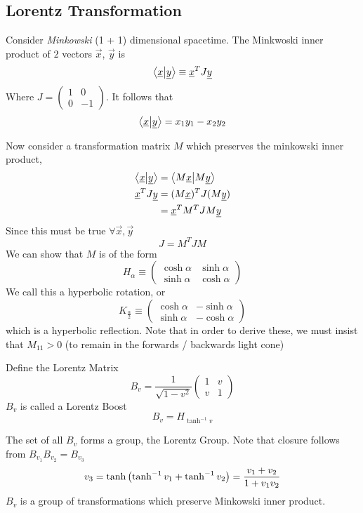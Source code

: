 \documentclass{article}
\numberwithin{equation}{section}
\begin{document}
\subsection{Lorentz Transformation}
Consider \emph{Minkowski} (1 + 1) dimensional spacetime. 
The Minkwoski inner product of $2$ vectors $\vec x$, $\vec y$ is 
\begin{equation}\label{eq:7-1}
    \left\langle \underline{x}\middle\vert \underline{y} \right\rangle \equiv \underline{x}^T J \underline{y}
\end{equation}
Where $J = \begin{pmatrix}
    1 & 0 \\
    0 & -1
\end{pmatrix}$. It follows that
\begin{equation}\label{eq:7-2}
    \left\langle \underline{x}\middle\vert \underline{y} \right\rangle = x_1y_1 - x_2y_2
\end{equation}

Now consider a transformation matrix $M$ which preserves the minkowski inner product,
\begin{align*}
    \left\langle \underline{x}\middle\vert \underline{y} \right\rangle &= \left\langle M\underline{x}\middle\vert M\underline{y} \right\rangle \\
    \underline{x}^T J \underline{y} &= (M\underline{x})^T J (M\underline{y}) \\
    &= \underline{x}^T M^T J M \underline{y}
\end{align*}
Since this must be true $\forall \vec x, \vec y$
\begin{equation}\label{eq:7-3}
    J = M^T J M
\end{equation}
We can show that $M$ is of the form
\[
    H_\alpha \equiv \begin{pmatrix}
        \cosh \alpha & \sinh \alpha \\
        \sinh \alpha & \cosh \alpha
    \end{pmatrix}
\]
We call this a hyperbolic rotation, or 
\[
    K_\frac{\alpha}{2} \equiv \begin{pmatrix}
        \cosh \alpha & - \sinh \alpha \\
        \sinh \alpha & - \cosh \alpha
    \end{pmatrix}
\]
which is a hyperbolic reflection.
Note that in order to derive these, we must insist that $M_{11} > 0$ (to remain in the forwards / backwards light cone)

\begin{defi}
    Define the Lorentz Matrix
    \[
        B_v = \frac{1}{\sqrt{1 - v^2}}\begin{pmatrix}
            1 & v \\
            v & 1
        \end{pmatrix}  
    \]
    $B_v$ is called a Lorentz Boost
    \begin{equation}\label{eq:7-4}
        B_v = H_{\tanh^{-1} v}
    \end{equation}
\end{defi}

The set of all $B_v$ forms a group, the Lorentz Group. 
Note that closure follows from $B_{v_1}B_{v_2} = B_{v_3}$
\[
    v_3 = \tanh \left( \tanh^{-1} v_1 + \tanh^{-1} v_2 \right) = \frac{v_1 + v_2}{1 + v_1 v_2}    
\]
$B_v$ is a group of transformations which preserve Minkowski inner product.
\end{document}
